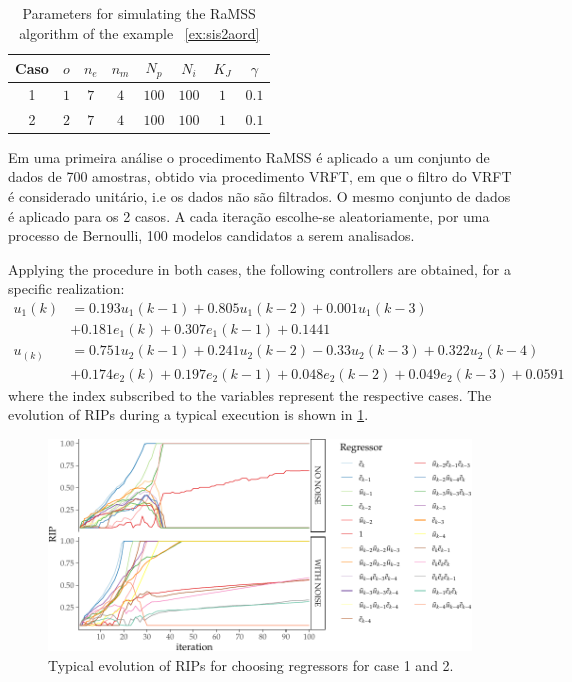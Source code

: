 \begin{exmp}
\begin{table}[htpb]
  \centering
  \caption{Parameters for simulating the RaMSS algorithm of the example ~\ref{ex:sis2aord}}\label{tab:exp51_param}
  \begin{tabular}{c|c|c|c|c|c|c|c}
    Caso & $o$ & $n_e$ & $n_m$ & $N_p$ & $N_i$ & $K_J$ & $\gamma$ \\
    \hline
    1 & $ 1 $ & $7$ & $4$ & $100$ & $100$ & $1$ & $0.1$ \\
    2 & $ 2 $ & $7$ & $4$ & $100$ & $100$ & $1$ & $0.1$
  \end{tabular}
\end{table}

Em uma primeira análise o procedimento RaMSS é aplicado a um conjunto de dados de 700 amostras, obtido via procedimento VRFT, em que o filtro do VRFT é considerado unitário, i.e os dados não são filtrados. O mesmo conjunto de dados é aplicado para os 2 casos. A cada iteração escolhe-se aleatoriamente, por uma processo de Bernoulli, 100 modelos candidatos a serem analisados. 

Applying the procedure in both cases, the following controllers are obtained, for a specific realization:
\begin{align*}
  u_1(k) &= 0.193{u}_1(k-1) + 0.805{u}_1(k-2) + 0.001{u}_1(k-3) \\
         &+ 0.181{e}_1(k) + 0.307{e}_1(k-1) + 0.1441 \\
  u_(k) &= 0.751{u}_2(k-1) + 0.241{u}_2(k-2) -0.33{u}_2(k-3) + 0.322{u}_2(k-4) \\
         &+ 0.174{e}_2(k) + 0.197{e}_2(k-1) + 0.048{e}_2(k-2) + 0.049{e}_2(k-3) + 0.0591
\end{align*}
where the index subscribed to the variables represent the respective cases.
The evolution of RIPs during a typical execution is shown in \ref{fig:ex51_RIPevol_2cases}.
\begin{figure}[H]
  \centering
  \includegraphics[width=\textwidth]{Figs/Cap5/ex51_rips_evol_2cases.tex.pdf}
  \caption{Typical evolution of RIPs for choosing regressors for case 1 and 2.}
  \label{fig:ex51_RIPevol_2cases}
\end{figure}



\end{exmp}
